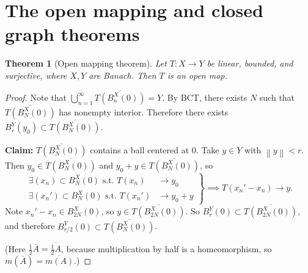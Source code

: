 \documentclass[12pt]{article}
\newcommand{\norm}[1]{\left\| #1 \right\|}
\newtheorem{thm}{Theorem}[section]
\theoremstyle{definition}
\begin{document}
\section{The open mapping and closed graph theorems}

\begin{thm}[Open mapping theorem]
	Let $T : X \to Y$ be linear, bounded, and surjective, where $X, Y$ are Banach.
	Then $T$ is an open map.
\end{thm}
\begin{proof}
	Note that $\bigcup_{n=1}^\infty \overline{T(B_n^X(0))} = Y$.
	By BCT, there exists $N$ such that $\overline{T(B_N^X(0))}$ has nonempty interior.
	Therefore there exists $B_r^Y(y_0) \subset \overline{T(B_N^X(0))}$.

	\textbf{Claim: } $\overline{T(B_N^X(0))}$ contains a ball centered at $0$.
	Take $y \in Y$ with $\norm{y} < r$.
	Then $y_0 \in \overline{T(B_N^X(0))}$ and $y_0 + y \in \overline{T(B_N^X(0))}$, so
	\begin{equation*}
		\left.
		\begin{aligned}
			\exists (x_n) \subset B_N^X(0) \text{ s.t. } T(x_n) &\to y_0 \\
			\exists (x_n') \subset B_N^X(0) \text{ s.t. } T(x_n') &\to y_0 + y
		\end{aligned}
		\right\rbrace \implies T(x_n' - x_n) \to y.
	\end{equation*}
	Note $x_n' - x_n \in B_{2N}^X(0)$, so $y \in \overline{T(B_{2N}^X(0))}$.
	So $B_r^Y(0) \subset \overline{T(B_{2N}^X(0))}$, and therefore $B_{r/2}^Y(0) \subset \overline{T(B_N^X(0))}$.

	(Here $\tfrac{1}{2}\overline{A} = \overline{\tfrac{1}{2}A}$, because multiplication by half is a homeomorphism, so $m(\overline{A}) = \overline{m(A)}$.)


\end{proof}
\end{document}
